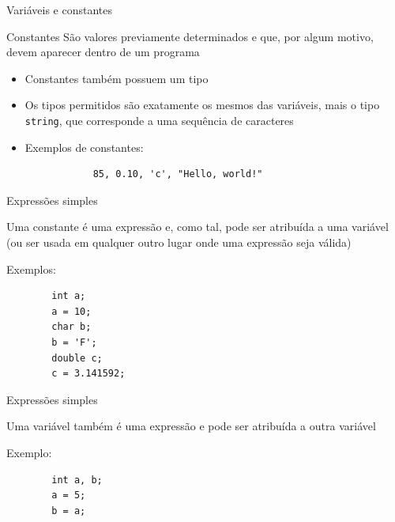 \documentclass[handout]{beamer}
\begin{document}
\begin{frame}[fragile]{Variáveis e constantes}

    \begin{block}{Constantes}
        São valores previamente determinados e que, por algum motivo, devem aparecer dentro de um programa
    \end{block}

    \pause
    \begin{itemize}[<+->]
        \item Constantes também possuem um tipo
        \item Os tipos permitidos são exatamente os mesmos das variáveis, mais o tipo {\tt string}, que corresponde a uma sequência de caracteres
        \item Exemplos de constantes:
        \begin{verbatim}
            85, 0.10, 'c', "Hello, world!"
        \end{verbatim}
    \end{itemize}
\end{frame}

\begin{frame}[fragile]{Expressões simples}

    \begin{block}{}
        Uma constante é uma expressão e, como tal, pode ser atribuída a uma variável (ou ser usada em qualquer outro lugar onde uma expressão seja válida)
    \end{block}

    \pause
    Exemplos:
    \begin{verbatim}
        int a;
        a = 10;
        char b;
        b = 'F';
        double c;
        c = 3.141592;
    \end{verbatim}

\end{frame}

\begin{frame}[fragile]{Expressões simples}

    \begin{block}{}
        Uma variável também é uma expressão e pode ser atribuída a outra variável
    \end{block}

    \pause
    Exemplo:
    \begin{verbatim}
        int a, b;
        a = 5;
        b = a;
    \end{verbatim}
\end{frame}
\end{document}
